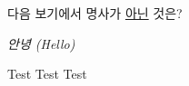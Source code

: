 \documentclass[chapter, footnote, a4paper, 11pt]{oblivoir}
\begin{document}
\pagestyle{myheading}

\tableofcontents*


다음 보기에서 명사가 \uline{아닌} 것은?

\textit{안녕 (Hello)}

\begin{mdframed}[frametitle=Test]
Test Test Test
\end{mdframed}






\printindex
\end{document}
